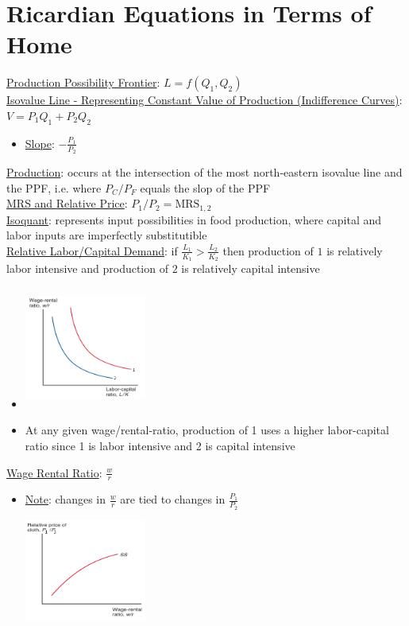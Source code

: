 \documentclass{article}
\begin{document}
\section{Ricardian Equations in Terms of Home}
\underline{Production Possibility Frontier}: $L = f(Q_{1}, Q_{2})$ \\
\underline{Isovalue Line - Representing Constant Value of Production (Indifference Curves)}: $V = P_{1}Q_{1} + P_{2}Q_{2}$
\begin{itemize}
  \item  \underline{Slope}: $-\tfrac{P_{1}}{P_{2}}$
\end{itemize}
\underline{Production}: occurs at the intersection of the most north-eastern isovalue line and the PPF, i.e. where $P_{C}/P_{F}$ equals the slop of the PPF  \\
\underline{MRS and Relative Price}: $P_{1}/P_{2} = \text{MRS}_{1,2}$ \\
\underline{Isoquant}: represents input possibilities in food production, where capital and labor inputs are imperfectly substitutible  \\
\underline{Relative Labor/Capital Demand}: if $\tfrac{L_{1}}{K_{1}} >  \tfrac{L_{2}}{K_{2}}$ then production of $1$ is relatively labor intensive and production of $2$ is relatively capital intensive
\begin{itemize}
  \item  \includegraphics[width=4cm, height=4cm]{pic1}
  \item  At any given wage/rental-ratio, production of 1 uses a higher labor-capital ratio since 1 is labor intensive and 2 is capital intensive
\end{itemize}
\underline{Wage Rental Ratio}: $\tfrac{w}{r}$
\begin{itemize}
  \item  \underline{Note}: changes in $\tfrac{w}{r}$ are tied to changes in $\tfrac{P_{1}}{P_{2}}$  \\
  \includegraphics[width=4cm, height=4cm]{pic2}
\end{itemize}
\end{document}
